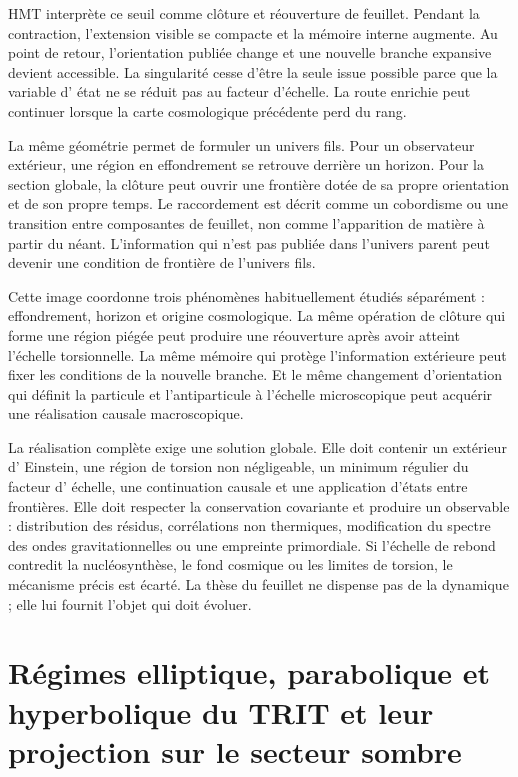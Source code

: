 HMT interprète ce seuil comme clôture et réouverture de feuillet. Pendant la contraction,
l'extension visible se compacte et la mémoire interne augmente. Au point de
retour, l'orientation publiée change et une nouvelle branche expansive devient
accessible. La singularité cesse d'être la seule issue possible parce que la variable d'
état ne se réduit pas au facteur d'échelle. La route enrichie peut continuer lorsque
la carte cosmologique précédente perd du rang.

La même géométrie permet de formuler un univers fils. Pour un observateur extérieur,
une région en effondrement se retrouve derrière un horizon. Pour la section globale, la clôture
peut ouvrir une frontière dotée de sa propre orientation et de son propre temps. Le raccordement est décrit
comme un cobordisme ou une transition entre composantes de feuillet, non comme l'apparition
de matière à partir du néant. L'information qui n'est pas publiée dans l'univers parent
peut devenir une condition de frontière de l'univers fils.

Cette image coordonne trois phénomènes habituellement étudiés séparément : effondrement,
horizon et origine cosmologique. La même opération de clôture qui forme une région
piégée peut produire une réouverture après avoir atteint l'échelle torsionnelle. La même
mémoire qui protège l'information extérieure peut fixer les conditions de la nouvelle
branche. Et le même changement d'orientation qui définit la particule et l'antiparticule à l'échelle
microscopique peut acquérir une réalisation causale macroscopique.

La réalisation complète exige une solution globale. Elle doit contenir un extérieur d'
Einstein, une région de torsion non négligeable, un minimum régulier du facteur d'
échelle, une continuation causale et une application d'états entre frontières. Elle doit respecter
la conservation covariante et produire un observable : distribution des résidus,
corrélations non thermiques, modification du spectre des ondes gravitationnelles ou une
empreinte primordiale. Si l'échelle de rebond contredit la nucléosynthèse, le fond cosmique ou les
limites de torsion, le mécanisme précis est écarté. La thèse du feuillet ne
dispense pas de la dynamique ; elle lui fournit l'objet qui doit évoluer.

\section{Régimes elliptique, parabolique et hyperbolique du TRIT et leur projection sur le secteur sombre}

